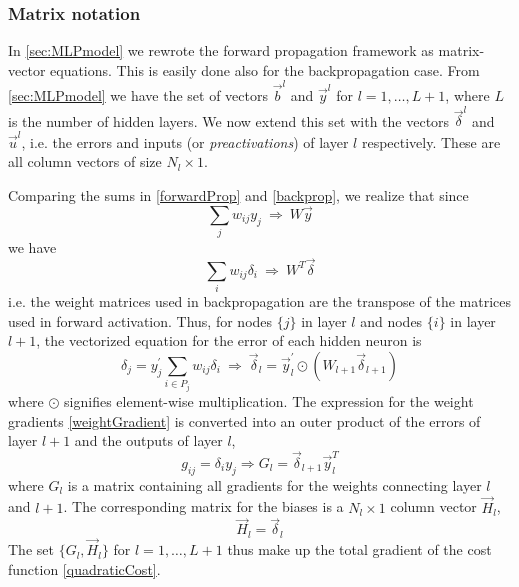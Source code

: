\documentclass[twoside,english]{uiofysmaster}
\begin{document}
\subsubsection{Matrix notation}
In \autoref{sec:MLPmodel} we rewrote the forward propagation framework as matrix-vector equations. 
This is easily done also for the backpropagation case. From \autoref{sec:MLPmodel} we have the
set of vectors $\vec{b}^l$ and $\vec{y}^l$ for $l = 1,\dots ,L+1$, 
where $L$ is the number of hidden layers. We now extend this set with the vectors $\vec{\delta}^l$ 
and $\vec{u}^l$, i.e. the errors and inputs (or \textit{preactivations}) of layer $l$
respectively. These are all column vectors of size $N_l \times 1$. 

\noindent Comparing the sums in \eqref{forwardProp} and \eqref{backprop}, we realize that since 
\begin{equation}
 \sum_j w_{ij} y_j \: \Rightarrow \: W \vec{y}
\end{equation}
we have
\begin{equation}
  \sum_i w_{ij} \delta_i \:  \Rightarrow \: W^T \vec{\delta}
\end{equation}
i.e. the weight matrices used in backpropagation are the transpose of the matrices used in forward activation.
Thus, for nodes $\{j\}$ in layer $l$ and nodes $\{i\}$ in layer $l+1$, the vectorized equation for the error of each hidden neuron is
\begin{equation}
 \delta_j = y^\prime_j\sum_{i\in P_j}w_{ij} \delta_i \: \Rightarrow \:
 \vec{\delta}_l = \vec{y}^\prime_l \odot (W_{l+1} \vec{\delta}_{l+1})
\end{equation}
where $\odot$ signifies element-wise multiplication. The expression for the weight gradients \eqref{weightGradient} is converted
into an outer product of the errors of layer $l+1$ and the outputs of layer $l$,
\begin{equation}
 g_{ij} = \delta_i y_j \Rightarrow G_l = \vec{\delta}_{l+1} \vec{y}^T_l
\end{equation}
where $G_l$ is a matrix containing all gradients for the weights connecting layer $l$ and $l+1$. 
The corresponding matrix for the biases is a $N_l \times 1$ column vector $\vec{H}_l$,
\begin{equation}
 \vec{H}_l = \vec{\delta}_l
\end{equation}
The set $\{G_l, \vec{H}_l\}$ for $l=1,\dots,L+1$ thus make up the total gradient of the cost function \eqref{quadraticCost}. 
\end{document}
